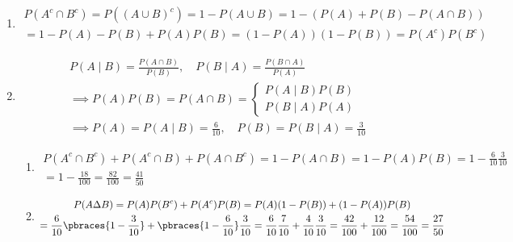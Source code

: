 \begin{solution}

\phantom{}

\begin{enumerate}[label = (\alph*)]

    \item

    \begin{multline*}
        P(A^c \cap B^c)
        =
        P((A \cup B)^c)
        =
        1 - P(A \cup B)
        =
        1 - (P(A) + P(B) - P(A \cap B)) \\
        =
        1 - P(A) - P(B) + P(A) P(B)
        =
        (1 - P(A)) (1 - P(B))
        =
        P(A^c) P(B^c)
    \end{multline*}

    \item

    \begin{align*}
        &
        P(A \mid B) = \frac{P(A \cap B)}{P(B)},
        \quad
        P(B \mid A) = \frac{P(B \cap A)}{P(A)} \\
        & \implies
        P(A) P(B)
        =
        P(A \cap B)
        =
        \begin{cases}
            P(A \mid B) P(B) \\
            P(B \mid A) P(A)
        \end{cases} \\
        & \implies
        P(A) = P(A \mid B) = \frac{6}{10},
        \quad
        P(B) = P(B \mid A) = \frac{3}{10}
    \end{align*}

    \begin{enumerate}[label = (\roman*)]

        \item

        \begin{multline*}
            P(A^c \cap B^c) + P(A^c \cap B) + P(A \cap B^c)
            =
            1 - P(A \cap B)
            =
            1 - P(A) P(B)
            =
            1 - \frac{6}{10} \frac{3}{10} \\
            =
            1 - \frac{18}{100}
            =
            \frac{82}{100} 
            =
            \frac{41}{50}
        \end{multline*}

        \item

        \begin{multline*}
            P(A \Delta B)
            =
            P(A) P(B^c) + P(A^c) P(B)
            =
            P(A) (1 - P(B)) + (1 - P(A)) P(B) \\
            =
            \frac{6}{10} \pbraces{1 - \frac{3}{10}} + \pbraces{1 - \frac{6}{10}} \frac{3}{10}
            =
            \frac{6}{10} \frac{7}{10} + \frac{4}{10} \frac{3}{10}
            =
            \frac{42}{100} + \frac{12}{100}
            =
            \frac{54}{100}
            =
            \frac{27}{50}
        \end{multline*}


\end{enumerate}
\end{enumerate}
\end{solution}
